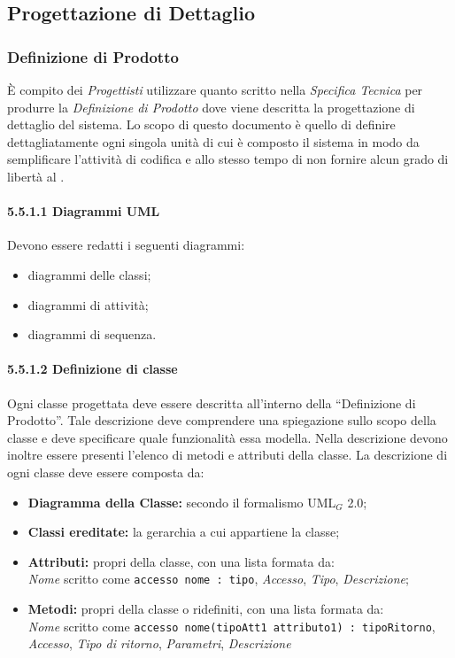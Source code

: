 \subsection{Progettazione di Dettaglio}


\subsubsection{Definizione di Prodotto}
È compito dei \textit{Progettisti} utilizzare quanto scritto nella \textit{Specifica Tecnica} per produrre la \textit{Definizione di Prodotto} dove viene descritta la progettazione di dettaglio del sistema. Lo scopo di questo documento è quello di definire dettagliatamente ogni singola unità di cui è composto il sistema in modo da semplificare l’attività di codifica e allo stesso tempo di non fornire alcun grado di libertà al \ruoloProgrammatore.

\paragraph{5.5.1.1 Diagrammi UML \\}

Devono essere redatti i seguenti diagrammi:

\begin{itemize}
	\item diagrammi delle classi;
	\item diagrammi di attività;
	\item diagrammi di sequenza.
\end{itemize}

\paragraph{5.5.1.2 Definizione di classe \\}
Ogni classe progettata deve essere descritta all’interno della “Definizione di
Prodotto”. Tale descrizione deve comprendere una spiegazione sullo scopo della classe e
deve specificare quale funzionalità essa modella. Nella descrizione devono inoltre essere
presenti l’elenco di metodi e attributi della classe.
La descrizione di ogni classe deve essere composta da:

\begin{itemize}

\item \textbf{Diagramma della Classe:} secondo il formalismo UML$_G$ 2.0;
\item \textbf{Classi ereditate:} la gerarchia a cui appartiene la classe;
\item \textbf{Attributi:} propri della classe, con una lista formata da: \\ \textit{Nome} scritto come \verb|accesso nome : tipo|, \textit{Accesso}, \textit{Tipo}, \textit{Descrizione};
\item \textbf{Metodi:} propri della classe o ridefiniti, con una lista formata da: \\ \textit{Nome} scritto come \verb|accesso nome(tipoAtt1 attributo1) : tipoRitorno|, \textit{Accesso}, \textit{Tipo di ritorno}, \textit{Parametri}, \textit{Descrizione}
\end{itemize}

